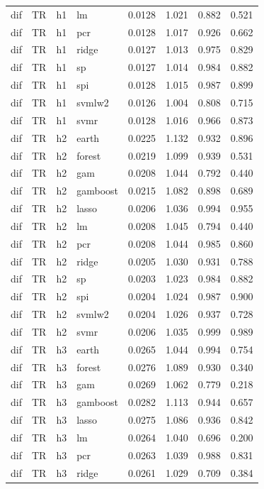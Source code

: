 \begin{ThreePartTable}
\begin{longtable}[t]{llclcccc}
dif & TR & h1 & lm & 0.0128 & 1.021 & 0.882 & 0.521\\
dif & TR & h1 & pcr & 0.0128 & 1.017 & 0.926 & 0.662\\
dif & TR & h1 & ridge & 0.0127 & 1.013 & 0.975 & 0.829\\
dif & TR & h1 & sp & 0.0127 & 1.014 & 0.984 & 0.882\\
dif & TR & h1 & spi & 0.0128 & 1.015 & 0.987 & 0.899\\
dif & TR & h1 & svmlw2 & 0.0126 & 1.004 & 0.808 & 0.715\\
dif & TR & h1 & svmr & 0.0128 & 1.016 & 0.966 & 0.873\\
\addlinespace
dif & TR & h2 & earth & 0.0225 & 1.132 & 0.932 & 0.896\\
dif & TR & h2 & forest & 0.0219 & 1.099 & 0.939 & 0.531\\
dif & TR & h2 & gam & 0.0208 & 1.044 & 0.792 & 0.440\\
dif & TR & h2 & gamboost & 0.0215 & 1.082 & 0.898 & 0.689\\
dif & TR & h2 & lasso & 0.0206 & 1.036 & 0.994 & 0.955\\
dif & TR & h2 & lm & 0.0208 & 1.045 & 0.794 & 0.440\\
dif & TR & h2 & pcr & 0.0208 & 1.044 & 0.985 & 0.860\\
dif & TR & h2 & ridge & 0.0205 & 1.030 & 0.931 & 0.788\\
dif & TR & h2 & sp & 0.0203 & 1.023 & 0.984 & 0.882\\
dif & TR & h2 & spi & 0.0204 & 1.024 & 0.987 & 0.900\\
dif & TR & h2 & svmlw2 & 0.0204 & 1.026 & 0.937 & 0.728\\
dif & TR & h2 & svmr & 0.0206 & 1.035 & 0.999 & 0.989\\
\addlinespace
dif & TR & h3 & earth & 0.0265 & 1.044 & 0.994 & 0.754\\
dif & TR & h3 & forest & 0.0276 & 1.089 & 0.930 & 0.340\\
dif & TR & h3 & gam & 0.0269 & 1.062 & 0.779 & 0.218\\
dif & TR & h3 & gamboost & 0.0282 & 1.113 & 0.944 & 0.657\\
dif & TR & h3 & lasso & 0.0275 & 1.086 & 0.936 & 0.842\\
dif & TR & h3 & lm & 0.0264 & 1.040 & 0.696 & 0.200\\
dif & TR & h3 & pcr & 0.0263 & 1.039 & 0.988 & 0.831\\
dif & TR & h3 & ridge & 0.0261 & 1.029 & 0.709 & 0.384\\

\end{longtable}
\end{ThreePartTable}
